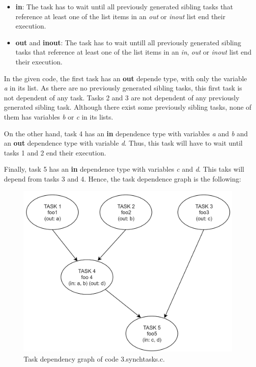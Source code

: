 \documentclass[12pt, a4paper]{article}
\begin{document}
\begin{itemize}
	\item \textbf{in}: The task has to wait until all previously generated sibling tasks that reference at least one of the list items in an \textit{out} or \textit{inout} list end their execution.
	\item \textbf{out} and \textbf{inout}: The task has to wait untill all previously generated sibling tasks that reference at least one of the list items in an \textit{in}, \textit{out} or \textit{inout} list end their execution.
\end{itemize}

In the given code, the first task has an \textbf{out} depende type, with only the variable \textit{a} in its list. As there are no previously generated sibling tasks, this first task is not dependent of any task. Tasks 2 and 3 are not dependent of any previously generated sibling task. Although there exist some previously sibling tasks, none of them has variables \textit{b} or \textit{c} in its lists.

On the other hand, task 4 has an \textbf{in} dependence type with variables \textit{a} and \textit{b} and an \textbf{out} dependence type with variable \textit{d}. Thus, this task will have to wait until tasks 1 and 2 end their execution.

Finally, task 5 has an \textbf{in} dependence type with variables \textit{c} and \textit{d}. This taks will depend from tasks 3 and 4. Hence, the task dependence graph is the following:

\begin{figure}[H]
  \centering
  \includegraphics[scale=0.5]{./images/synchtasks}
  \caption{Task dependency graph of code 3.synchtasks.c.}
  \label{Task dependency graph of code 3.synchtasks.c.}
\end{figure}
\end{document}
